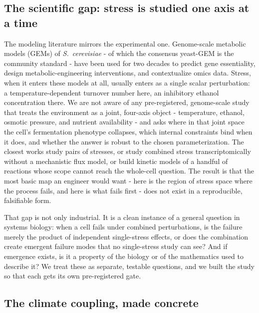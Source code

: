 \documentclass[12pt]{article}
\begin{document}
\subsection{The scientific gap: stress is studied one axis at a time}

The modeling literature mirrors the experimental one. Genome-scale
metabolic models (GEMs) of \emph{S.\ cerevisiae} - of which the consensus
yeast-GEM is the community standard - have been used for two decades to
predict gene essentiality, design metabolic-engineering interventions, and
contextualize omics data. Stress, when it enters these models at all,
usually enters as a single scalar perturbation: a temperature-dependent
turnover number here, an inhibitory ethanol concentration there. We are
not aware of any pre-registered, genome-scale study that treats the
environment as a joint, four-axis object - temperature, ethanol, osmotic
pressure, and nutrient availability - and asks where in that joint space
the cell's fermentation phenotype collapses, which internal constraints
bind when it does, and whether the answer is robust to the chosen
parameterization. The closest works study pairs of stresses, or study
combined stress transcriptomically without a mechanistic flux model, or
build kinetic models of a handful of reactions whose scope cannot reach
the whole-cell question. The result is that the most basic map an
engineer would want - here is the region of stress space where the
process fails, and here is what fails first - does not exist in a
reproducible, falsifiable form.

That gap is not only industrial. It is a clean instance of a general
question in systems biology: when a cell fails under combined
perturbations, is the failure merely the product of independent
single-stress effects, or does the combination create emergent failure
modes that no single-stress study can see? And if emergence exists, is it
a property of the biology or of the mathematics used to describe it? We
treat these as separate, testable questions, and we built the study so
that each gets its own pre-registered gate.


\subsection{The climate coupling, made concrete}
\end{document}
